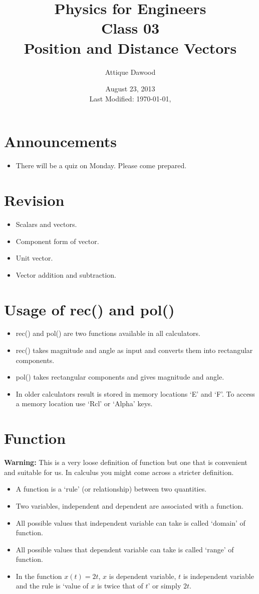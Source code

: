 \documentclass[12pt,a4paper]{article}
\title{\vspace{-2cm}Physics for Engineers\\Class 03\\Position and Distance Vectors}
\author{Attique Dawood}
\date{August 23, 2013\\[0.2cm] Last Modified: \today, \currenttime}
\begin{document}
\maketitle
\section{Announcements}
\begin{itemize}
\item There will be a quiz on Monday. Please come prepared.
\end{itemize}
\section{Revision}
\begin{itemize}
\item Scalars and vectors.
\item Component form of vector.
\item Unit vector.
\item Vector addition and subtraction.
\end{itemize}
\section{Usage of rec() and pol()}
\begin{itemize}
\item rec() and pol() are two functions available in all calculators.
\item rec() takes magnitude and angle as input and converts them into rectangular components.
\item pol() takes rectangular components and gives magnitude and angle.
\item In older calculators result is stored in memory locations `E' and `F'. To access a memory location use `Rcl' or `Alpha' keys.
\end{itemize}
\section{Function}
\noindent\textbf{Warning:} This is a very loose definition of function but one that is convenient and suitable for us. In calculus you might come across a stricter definition.
\begin{itemize}
\item A function is a `rule' (or relationship) between two quantities.
\item Two variables, independent and dependent are associated with a function.
\item All possible values that independent variable can take is called `domain' of function.
\item All possible values that dependent variable can take is called `range' of function.
\item In the function $x(t)=2t$, $x$ is dependent variable, $t$ is independent variable and the rule is `value of $x$ is twice that of $t$' or simply $2t$.
\end{itemize}
\end{document}
